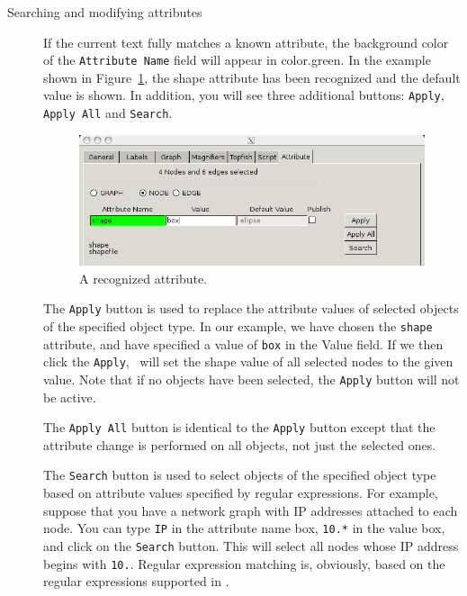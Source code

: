 \begin{description}
\item[Searching and modifying attributes]
If the current text fully matches a known attribute,
the background color of the {\tt Attribute Name} field will appear in color.green. 
In the example shown in Figure~\ref{fig:attr3}, the shape attribute has been
recognized and the default value is shown. 
In addition, you will see three additional buttons: {\tt Apply}, {\tt Apply All} and {\tt Search}.

\begin{figure}[ht]
\begin{center}
\includegraphics[scale=.5]{figures/attr3.png}
\caption{\small A recognized attribute.}
\label{fig:attr3}
\end{center}
\end{figure}

The {\tt Apply} button is used to replace the attribute values of selected objects of the 
specified object type. In our example, we have chosen the {\tt shape} attribute, 
and have specified a value of {\tt box} in the Value field. If we then click the {\tt Apply},
\smyrna\ will set the shape value of all selected nodes to the given value.
Note that if no objects have been selected, the {\tt Apply} button will not be active.

The {\tt Apply All} button is identical to the {\tt Apply} button except that the
attribute change is performed on all objects, not just the selected ones.

The {\tt Search} button is used to select objects of the specified object type based on
attribute values specified by regular expressions.
For example, suppose that you have a network graph with IP addresses 
attached to each node. You can type {\tt IP} in the attribute name box, {\tt 10.*} in the
value box, and click on the {\tt Search} button. 
This will select all nodes whose IP address begins with {\tt 10.}. Regular expression
matching is, obviously, based on the regular expressions supported in \gvpr.


\end{description}
